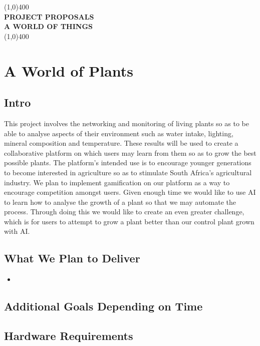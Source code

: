\documentclass{article}
\begin{document}
\begin{titlepage}
	\begin{center}
		\line(1,0){400}\\
		[6mm]
		\huge{\bfseries PROJECT PROPOSALS\\A WORLD OF THINGS}\\
		\line(1,0){400}\\
	\end{center}
\end{titlepage}

\section{A World of Plants}
	\subsection{Intro}
		This project involves the networking and monitoring of living plants so as to be able to analyse aspects of their environment such as water intake, lighting, mineral composition and temperature. These results will be used to create a collaborative platform on which users may learn from them so as to grow the best possible plants. The platform's intended use is to encourage younger generations to become interested in agriculture so as to stimulate South Africa's agricultural industry. We plan to implement gamification on our platform as a way to encourage competition amongst users. Given enough time we would like to use AI to learn how to analyse the growth of a plant so that we may automate the process. Through doing this we would like to create an even greater challenge, which is for users to attempt to grow a plant better than our control plant grown with AI.
	\subsection{What We Plan to Deliver}
		\begin{itemize}
			\item
		\end{itemize}
	\subsection{Additional Goals Depending on Time}
	\subsection{Hardware Requirements}
\end{document}
